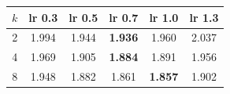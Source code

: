 \begin{tabular}{cccccc}
\toprule
$k$ & lr 0.3 & lr 0.5 & lr 0.7 & lr 1.0 & lr 1.3 \\
\midrule
2 & 1.994 & 1.944 & \textbf{1.936} & 1.960 & 2.037 \\
4 & 1.969 & 1.905 & \textbf{1.884} & 1.891 & 1.956 \\
8 & 1.948 & 1.882 & 1.861 & \textbf{1.857} & 1.902 \\
\bottomrule
\end{tabular}
